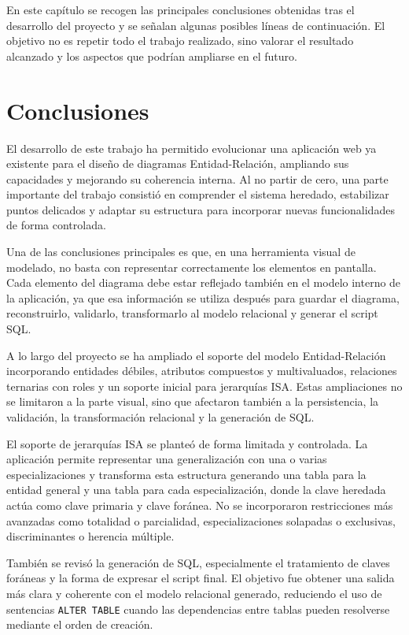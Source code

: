 
En este capítulo se recogen las principales conclusiones obtenidas tras el desarrollo del proyecto y se señalan algunas posibles líneas de continuación. El objetivo no es repetir todo el trabajo realizado, sino valorar el resultado alcanzado y los aspectos que podrían ampliarse en el futuro.

\section{Conclusiones}

El desarrollo de este trabajo ha permitido evolucionar una aplicación web ya existente para el diseño de diagramas Entidad-Relación, ampliando sus capacidades y mejorando su coherencia interna. Al no partir de cero, una parte importante del trabajo consistió en comprender el sistema heredado, estabilizar puntos delicados y adaptar su estructura para incorporar nuevas funcionalidades de forma controlada.

Una de las conclusiones principales es que, en una herramienta visual de modelado, no basta con representar correctamente los elementos en pantalla. Cada elemento del diagrama debe estar reflejado también en el modelo interno de la aplicación, ya que esa información se utiliza después para guardar el diagrama, reconstruirlo, validarlo, transformarlo al modelo relacional y generar el script SQL.

A lo largo del proyecto se ha ampliado el soporte del modelo Entidad-Relación incorporando entidades débiles, atributos compuestos y multivaluados, relaciones ternarias con roles y un soporte inicial para jerarquías ISA. Estas ampliaciones no se limitaron a la parte visual, sino que afectaron también a la persistencia, la validación, la transformación relacional y la generación de SQL.

El soporte de jerarquías ISA se planteó de forma limitada y controlada. La aplicación permite representar una generalización con una o varias especializaciones y transforma esta estructura generando una tabla para la entidad general y una tabla para cada especialización, donde la clave heredada actúa como clave primaria y clave foránea. No se incorporaron restricciones más avanzadas como totalidad o parcialidad, especializaciones solapadas o exclusivas, discriminantes o herencia múltiple.

También se revisó la generación de SQL, especialmente el tratamiento de claves foráneas y la forma de expresar el script final. El objetivo fue obtener una salida más clara y coherente con el modelo relacional generado, reduciendo el uso de sentencias \texttt{ALTER TABLE} cuando las dependencias entre tablas pueden resolverse mediante el orden de creación.

